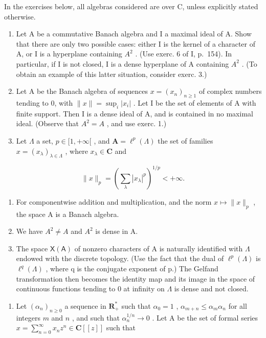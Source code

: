 
In the exercises below, all algebras considered are over C, unless explicitly stated otherwise.

\begin{enumerate}
\def\labelenumi{\arabic{enumi})}
\item
  Let A be a commutative Banach algebra and I a maximal ideal of A. Show that there are only two possible cases: either I is the kernel of a character of A, or I is a hyperplane containing \(A^{2}\) . (Use exerc. 6 of I, p.~154). In particular, if I is not closed, I is a dense hyperplane of A containing \(A^{2}\) . (To obtain an example of this latter situation, consider exerc. 3.)
\item
  Let A be the Banach algebra of sequences \(x = (x_{n})_{n \geqslant 1}\) of complex numbers tending to 0, with \(\|x\| = \sup_{i} |x_{i}|\) . Let I be the set of elements of A with finite support. Then I is a dense ideal of A, and is contained in no maximal ideal. (Observe that \(A^{2} = A\) , and use exerc. 1.)
\item
  Let \(\Lambda\) a set, \(p \in [1, +\infty[\) , and \(\mathbf{A} = \ell^p(\Lambda)\) the set of families \(x = (x_{\lambda})_{\lambda \in \Lambda}\) , where \(x_{\lambda} \in \mathbf{C}\) and
\end{enumerate}

\[
\| x \| _ {p} = \left(\sum_ {\lambda} | x _ {\lambda} | ^ {p}\right) ^ {1 / p} <   + \infty .
\]

\begin{enumerate}
\def\labelenumi{\alph{enumi})}
\item
  For componentwise addition and multiplication, and the norm \(x \mapsto \| x \|_p\) , the space A is a Banach algebra.
\item
  We have \(A^{2} \neq A\) and \(A^{2}\) is dense in A.
\item
  The space \(\mathsf{X}(\mathsf{A})\) of nonzero characters of A is naturally identified with \(\Lambda\) endowed with the discrete topology. (Use the fact that the dual of \(\ell^{p}(\Lambda)\) is \(\ell^{q}(\Lambda)\) , where q is the conjugate exponent of p.) The Gelfand transformation then becomes the identity map and its image in the space of continuous functions tending to 0 at infinity on \(\Lambda\) is dense and not closed.
\end{enumerate}

\begin{enumerate}
\def\labelenumi{\arabic{enumi})}
\setcounter{enumi}{3}
\tightlist
\item
  Let \((\alpha_{n})_{n\geqslant 0}\) a sequence in \(\mathbf{R}_{+}^{*}\) such that \(\alpha_0 = 1\) , \(\alpha_{m + n}\leqslant \alpha_m\alpha_n\) for all integers \(m\) and \(n\) , and such that \(\alpha_{n}^{1 / n}\to 0\) . Let A be the set of formal series \(x = \sum_{n = 0}^{\infty}x_{n}z^{n}\in \mathbf{C}[[z]]\) such that
\end{enumerate}

